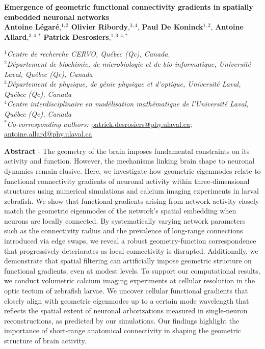 \documentclass{article}
\begin{document}
\begin{center}

    {\Large \textbf{Emergence of geometric functional connectivity gradients in spatially embedded neuronal networks}}\\
    
    \vspace{10 pt}
    \textbf{Antoine Légaré},$^{1,2}$ \textbf{Olivier Ribordy},$^{3,4}$, \textbf{Paul De Koninck}$^{1,2}$, \textbf{Antoine Allard},$^{3,4,*}$ \textbf{Patrick Desrosiers},$^{1,3,4,*}$ \\
    \vspace{5 pt}
    
    $^1$\textit{Centre de recherche CERVO, Québec (Qc), Canada.}\\
    $^2$\textit{Département de biochimie, de microbiologie et de bio-informatique, Université Laval, Québec (Qc), Canada}\\
    $^3$\textit{D\'epartement de physique, de g\'enie physique et d'optique, Universit\'e Laval, Qu\'ebec (Qc), Canada}\\%
    $^4$\textit{Centre interdisciplinaire en mod\'elisation math\'ematique de l'Universit\'e Laval, Qu\'ebec (Qc), Canada}\\
     $^*$\textit{Co-corresponding authors:} \href{mailto:patrick.desrosiers@phy.ulaval.ca}{patrick.desrosiers@phy.ulaval.ca}; \href{mailto:antoine.allard@nphy.ulaval.ca}{antoine.allard@phy.ulaval.ca}

\end{center}

\vspace{4 pt}

\hrulefill

\textbf{Abstract} - The geometry of the brain imposes fundamental constraints on its activity and function. However, the mechanisms linking brain shape to neuronal dynamics remain elusive. Here, we investigate how geometric eigenmodes relate to functional connectivity gradients of neuronal activity within three-dimensional structures using numerical simulations and calcium imaging experiments in larval zebrafish. We show that functional gradients arising from network activity closely match the geometric eigenmodes of the network’s spatial embedding when neurons are locally connected. By systematically varying network parameters such as the connectivity radius and the prevalence of long-range connections introduced via edge swaps, we reveal a robust geometry-function correspondence that progressively deteriorates as local connectivity is disrupted. Additionally, we demonstrate that spatial filtering can artificially impose geometric structure on functional gradients, even at modest levels. To support our computational results, we conduct volumetric calcium imaging experiments at cellular resolution in the optic tectum of zebrafish larvae. We uncover cellular functional gradients that closely align with geometric eigenmodes up to a certain mode wavelength that reflects the spatial extent of neuronal arborizations measured in single-neuron reconstructions, as predicted by our simulations. Our findings highlight the importance of short-range anatomical connectivity in shaping the geometric structure of brain activity.
\end{document}
